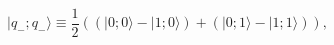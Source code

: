 \begin{equation}
\label{2mm}
|q_-;q_- \rangle \equiv \frac{1}{2}\left(  
(|0;0 \rangle-|1;0 \rangle)+(|0;1 \rangle-|1;1 \rangle)\right),
\end{equation}

